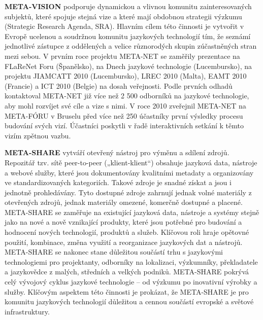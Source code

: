 \documentclass[]{../../metanetpaper}
\begin{document}
\begin{multicols}{2}
\textbf{META-VISION} podporuje dynamickou a vlivnou komunitu zainteresovaných subjektů, které spojuje stejná vize a které mají obdobnou strategii výzkumu (Strategic Research Agenda, SRA). Hlavním cílem této činnosti je vytvořit v Evropě ucelenou a soudržnou komunitu jazykových technologií tím, že seznámí jednotlivé zástupce z oddělených a velice různorodých skupin zúčastněných stran mezi sebou. V prvním roce projektu META-NET se zaměřily prezentace na FLaReNet Foru (Španělsko), na Dnech jazykové technologie (Lucembursko), na projektu JIAMCATT 2010 (Lucembursko), LREC 2010 (Malta), EAMT 2010 (Francie) a ICT 2010 (Belgie) na dosah veřejnosti. Podle prvních odhadů kontaktoval META-NET již více než 2 500 odborníků na jazykové technologie, aby mohl rozvíjet své cíle a vize s nimi. V roce 2010 zveřejnil META-NET na META-FÓRU v Bruselu před více než 250 účastníky první výsledky procesu budování svých vizí. Účastníci poskytli v řadě interaktivních setkání k těmto vizím zpětnou vazbu.

\textbf{META-SHARE} vytváří otevřený nástroj pro výměnu a sdílení zdrojů. Repozitář tzv. sítě peer-to-peer („klient-klient“) obsahuje jazyková data, nástroje a webové služby, které jsou dokumentovány kvalitními metadaty a organizovány ve standardizovaných kategoriích. Takové zdroje je snadné získat a jsou i jednotně prohledávány. Tyto dostupné zdroje zahrnují jednak volné materiály z otevřených zdrojů, jednak materiály omezené, komerčně dostupné a placené. META-SHARE se zaměřuje na existující jazyková data, nástroje a systémy stejně jako na nové a nově vznikající produkty, které jsou potřebné pro budování a hodnocení nových technologií, produktů a služeb. Klíčovou roli hraje opětovné použití, kombinace, změna využití a reorganizace jazykových dat a nástrojů. META-SHARE se nakonec stane důležitou součástí trhu s jazykovými technologiemi pro projektanty, odborníky na lokalizaci, výzkumníky, překladatele a jazykovědce z malých, středních a velkých podniků. META-SHARE pokrývá celý vývojový cyklus jazykové technologie – od výzkumu po inovativní výrobky a služby. Klíčovým aspektem této činnosti je prokázat, že META-SHARE je pro komunitu jazykových technologií důležitou a cennou součástí evropské a světové infrastruktury.


\end{multicols}
\end{document}
